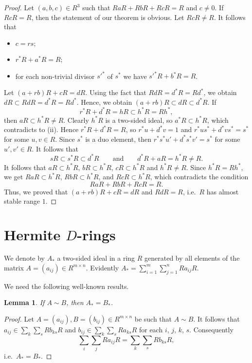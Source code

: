 \documentclass[10pt,a4paper]{amsart}
\theoremstyle{plain}
\newtheorem{lemma}{Lemma}
\theoremstyle{definition}
\begin{document}
\begin{proof}
Let  $(a,b,c)\in R^3$ such that  $RaR+RbR+RcR=R$ and  $c\ne 0$. If $RcR=R$, then the statement of our  theorem is obvious. Let $RcR\ne R$.
It follows that
\begin{itemize}
\item[(i)] $c=rs$;
\item[(ii)] $r^*R+a^*R=R$;
\item[(iii)] for each non-trivial divisor $s'^*$ of $s^*$ we have $s'^*R+b^*R=R$.
\end{itemize}

Let $(a+rb)R+cR=dR$. Using the fact that  $RdR=d^*R=Rd^*$, we obtain \linebreak
$dR\subset RdR=d^*R=Rd^*$. Hence, we obtain $(a+rb)R\subset dR\subset d^*R$. If
\[
r^*R+d^*R=hR\subset h^*R=Rh^*,
\]
then  $aR\subset h^*R\ne R$. Clearly  $h^*R$ is a two-sided ideal, so  $a^*R\subset h^*R$, which contradicts to (ii).
Hence $r^*R+d^*R=R$, so  $r^*u+d^*v=1$ and $r^*us^*+d^*vs^*=s^*$ for some $u,v\in R$. Since $s^*$ is a duo element, then $r^*s^*u'+d^*s^*v'=s^*$ for some $u',v'\in R$. It follows that
\[
sR\subset s^*R\subset d^*R\qquad \text{and}\qquad  d^*R+aR=h^*R\ne R.
\]
It follows that $aR\subset h^*R$, $bR\subset h^*R$, $cR\subset h^*R$ and $h^*R\ne R$. Since $h^*R=Rh^*$, we get  $RaR\subset h^*R$, $RbR\subset h^*R$, and  $RcR\subset h^*R$, which contradicts the condition \[
RaR+RbR+RcR=R.
\]
Thus, we proved that
$(a+rb)R+cR=dR$ and $RdR=R$, i.e.~$R$ has almost stable range $1$.
\end{proof}


\section{ Hermite $D$-rings}

We denote by $A_*$ a two-sided ideal in a ring $R$ generated by all elements of  the matrix $A=(a_{ij})\in R^{m\times n}$.
Evidently $A_*=\sum\limits_{i=1}^m\sum\limits_{j=1}^n Ra_{ij}R$.

We need the   following  well-known results.
\begin{lemma}\label{Lemma:2}
If $A\sim B$, then $A_*=B_*$.
\end{lemma}
\begin{proof}
Let $A=(a_{ij}), B=(b_{ij})\in R^{m\times n}$ be such that $A\sim B$. It follows that  $a_{ij}\in \sum_k\sum_sRb_{ks}R$ and $b_{ij}\in \sum_k\sum_sRa_{ks}R$ for each $i$, $j$, $k$, $s$. Consequently
\[
    \sum_i\sum_jRa_{ij}R= \sum_k\sum_sRb_{ks}R,
\]
i.e.~$A_*=B_*$.
\end{proof}
\end{document}
